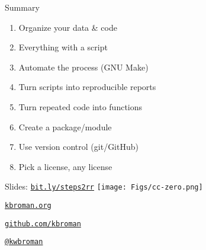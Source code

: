 \documentclass[12pt,t]{beamer}
\begin{document}
\begin{frame}[c]{Summary}

  \begin{enumerate}
  \itemsep12pt
  \item Organize your data \& code
  \item Everything with a script
  \item Automate the process (GNU Make)
  \item Turn scripts into reproducible reports
  \item Turn repeated code into functions
  \item Create a package/module
  \item Use version control (git/GitHub)
  \item Pick a license, any license
  \end{enumerate}

\end{frame}

\begin{frame}[c]{}

\Large

Slides: \href{https://bit.ly/steps2rr}{\tt bit.ly/steps2rr} \quad
\texttt{[image: Figs/cc-zero.png]}

\vspace{10mm}

\href{http://kbroman.org}{\tt kbroman.org}

\vspace{10mm}

\href{https://github.com/kbroman}{\tt github.com/kbroman}

\vspace{10mm}

\href{https://twitter.com/kwbroman}{\tt @kwbroman}


\end{frame}
\end{document}
